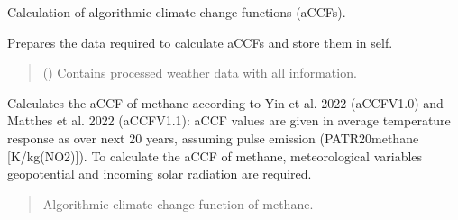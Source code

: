 \documentclass[a4paper,11pt,english]{sphinxmanual}
\begin{document}
\begin{fulllineitems}
\label{\detokenize{modules:envlib.accf.GeTaCCFs}}
\pysigstartsignatures
{}
\pysigstopsignatures
\sphinxAtStartPar
Calculation of algorithmic climate change functions (aCCFs).

\begin{fulllineitems}
\label{\detokenize{modules:envlib.accf.GeTaCCFs.__init__}}
\pysigstartsignatures
{}
\pysigstopsignatures
\sphinxAtStartPar
Prepares the data required to calculate aCCFs and store them in self.
\begin{quote}\begin{description}
\sphinxAtStartPar
{} () \textendash{} Contains processed weather data with all information.

\end{description}\end{quote}

\end{fulllineitems}


\begin{fulllineitems}
\label{\detokenize{modules:envlib.accf.GeTaCCFs.accf_ch4}}
\pysigstartsignatures
{}
\pysigstopsignatures
\sphinxAtStartPar
Calculates the aCCF of methane according to Yin et al. 2022 (aCCF\sphinxhyphen{}V1.0) and Matthes et al. 2022 (aCCF\sphinxhyphen{}V1.1): aCCF values are  given in average 
temperature response as over next 20 years, assuming pulse emission (P\sphinxhyphen{}ATR20\sphinxhyphen{}methane {[}K/kg(NO2){]}). To calculate the aCCF of methane, meteorological
variables geopotential and incoming solar radiation are required.
\begin{quote}\begin{description}
\sphinxAtStartPar
Algorithmic climate change function of methane.


\end{description}
\end{quote}
\end{fulllineitems}
\end{fulllineitems}
\end{document}
